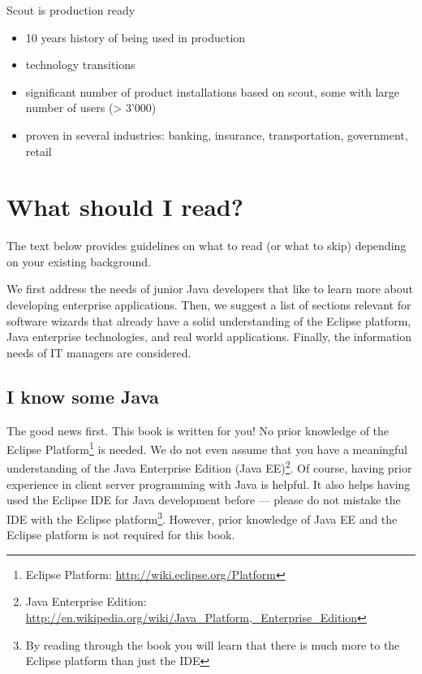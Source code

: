 \documentclass[a4paper,10pt,twoside]{book}
\begin{document}
Scout is production ready
\begin{itemize}
  \item 10 years history of being used in production
  \item technology transitions
  \item significant number of product installations based on scout, some with large number of users (> 3'000)
  \item proven in several industries: banking, insurance, transportation, government, retail
\end{itemize}

\section{What should I read?} 

The text below provides guidelines on what to read (or what to skip) depending on your existing background.

We first address the needs of junior Java developers that like to learn more about developing enterprise applications.
Then, we suggest a list of sections relevant for software wizards that already have a solid understanding of the Eclipse platform, Java enterprise technologies, and real world applications.
Finally, the information needs of IT managers are considered.

\subsection{I know some Java}

The good news first.
This book is written for you! 
No prior knowledge of the Eclipse Platform\footnote{Eclipse Platform: \url{http://wiki.eclipse.org/Platform}} is needed. 
We do not even assume that you have a meaningful understanding of the Java Enterprise Edition 
(Java EE)\footnote{Java Enterprise Edition: \url{http://en.wikipedia.org/wiki/Java_Platform,_Enterprise_Edition}}.
Of course, having prior experience in client server programming with Java is helpful.
It also helps having used the Eclipse IDE for Java development before --- please do not mistake the IDE with the Eclipse 
platform\footnote{By reading through the book you will learn that there is much more to the Eclipse platform than just the IDE}.
However, prior knowledge of Java EE and the Eclipse platform is not required for this book.
\end{document}
